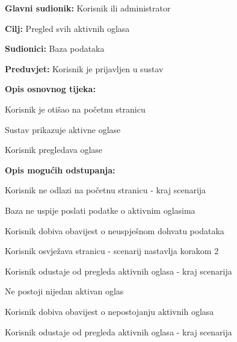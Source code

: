 					\eject

					\noindent {}
					\begin{packed_item}
	
						\item \textbf{Glavni sudionik: }Korisnik ili administrator
						\item  \textbf{Cilj:} Pregled svih aktivnih oglasa
						\item  \textbf{Sudionici:} Baza podataka
						\item  \textbf{Preduvjet:} Korisnik je prijavljen u sustav
						\item  \textbf{Opis osnovnog tijeka:}
						
						\item[] \begin{packed_enum}
							\item Korisnik je otišao na početnu stranicu
							\item Sustav prikazuje aktivne oglase
							\item Korisnik pregledava oglase
						\end{packed_enum}
						\item  \textbf{Opis mogućih odstupanja:}

						\item[] \begin{packed_item}
							\item[1.a] Korisnik ne odlazi na početnu stranicu - kraj scenarija
							\item[2.a] Baza ne uspije poslati podatke o aktivnim oglasima
							\item[] \begin{packed_enum}
								
								\item Korisnik dobiva obavijest o neuspješnom dohvatu podataka
								\item
									\begin{packed_enum}
										\item Korisnik osvježava stranicu - scenarij nastavlja korakom 2
										\item Korisnik odustaje od pregleda aktivnih oglasa - kraj scenarija
									\end{packed_enum}
							
							\end{packed_enum}	
							\item[2.b] Ne postoji nijedan aktivan oglas
							\item[] \begin{packed_enum}
								
								\item Korisnik dobiva obavijest o nepostojanju aktivnih oglasa
								\item Korisnik odustaje od pregleda aktivnih oglasa - kraj scenarija
							
							\end{packed_enum}
						\end{packed_item}	
					\end{packed_item}

